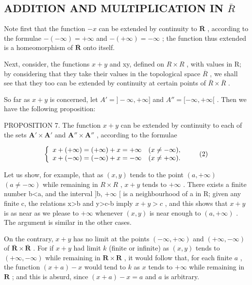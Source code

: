 \subsection{\texorpdfstring{ADDITION AND MULTIPLICATION IN \(\bar{R}\)}{ADDITION AND MULTIPLICATION IN \textbackslash bar\{R\}}}

Note first that the function \(-x\) can be extended by continuity to \(\overline{\mathbf{R}}\) , according to the formulae \(-(-\infty)=+\infty\) and \(-(+\infty)=-\infty\) ; the function thus extended is a homeomorphism of \(\overline{\mathbf{R}}\) onto itself.

Next, consider, the functions \(x + y\) and xy, defined on \(R \times R\) , with values in R; by considering that they take their values in the topological space \(\overline{R}\) , we shall see that they too can be extended by continuity at certain points of \(\overline{R} \times \overline{R}\) .

So far as \(x + y\) is concerned, let \(A' = ] - \infty, + \infty]\) and \(A'' = [-\infty, + \infty[\) . Then we have the following proposition:

PROPOSITION 7. The function \(x + y\) can be extended by continuity to each of the sets \(\mathbf{A}' \times \mathbf{A}'\) and \(\mathbf{A}'' \times \mathbf{A}''\) , according to the formulae

\[
\left\{ \begin{array}{l l} x + (+ \infty) = (+ \infty) + x = + \infty & (x \neq - \infty), \\ x + (- \infty) = (- \infty) + x = - \infty & (x \neq + \infty). \end{array} \right.\tag{2}
\]

Let us show, for example, that as \((x,y)\) tends to the point \((a,+\infty)\) \((a\neq-\infty)\) while remaining in \(R\times R\) , \(x+y\) tends to \(+\infty\) . There exists a finite number b\textless a, and the interval {]}b, \(+\infty\) {[} is a neighbourhood of a in R; given any finite c, the relations x\textgreater b and y\textgreater c-b imply \(x+y>c\) , and this shows that \(x+y\) is as near as we please to \(+\infty\) whenever \((x,y)\) is near enough to \((a,+\infty)\) . The argument is similar in the other cases.

On the contrary, \(x + y\) has no limit at the points \((-\infty, +\infty)\) and \((+\infty, -\infty)\) of \(\overline{\mathbf{R}} \times \overline{\mathbf{R}}\) . For if \(x + y\) had limit \(k\) (finite or infinite) as \((x, y)\) tends to \((+\infty, -\infty)\) while remaining in \(\mathbf{R} \times \mathbf{R}\) , it would follow that, for each finite \(a\) , the function \((x + a) - x\) would tend to \(k\) as \(x\) tends to \(+\infty\) while remaining in \(\mathbf{R}\) ; and this is absurd, since \((x + a) - x = a\) and \(a\) is arbitrary.

